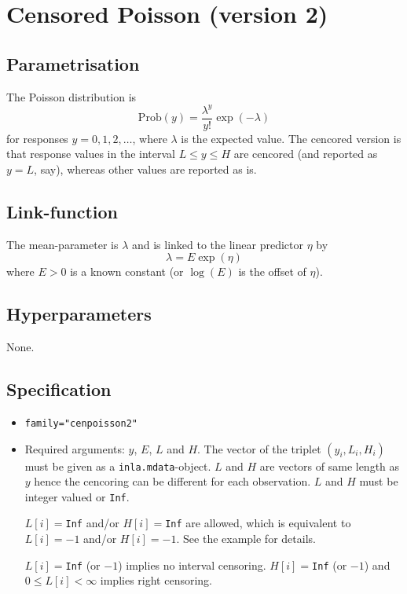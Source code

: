 \documentclass[a4paper,11pt]{article}
\begin{document}
\section*{Censored Poisson (version 2)}

\subsection*{Parametrisation}

The Poisson distribution is
\begin{displaymath}
    \text{Prob}(y) = \frac{\lambda^{y}}{y!}\exp(-\lambda)
\end{displaymath}
for responses $y=0, 1, 2, \ldots$, where $\lambda$ is the expected
value.  The cencored version is that response values in the interval
$L \le y \le H$ are cencored (and reported as $y=L$, say), whereas
other values are reported as is.

\subsection*{Link-function}

The mean-parameter is $\lambda$ and is linked to the linear predictor $\eta$
by
\begin{displaymath}
    \lambda = E \exp(\eta)
\end{displaymath}
where $E>0$ is a known constant (or $\log(E)$ is the offset of $\eta$).

\subsection*{Hyperparameters}

None.

\subsection*{Specification}

\begin{itemize}
\item \texttt{family="cenpoisson2"}
\item Required arguments: $y$, $E$, $L$ and $H$. The vector of the
    triplet $(y_i,L_i,H_i)$ must be given as a
    \texttt{inla.mdata}-object. $L$ and $H$ are vectors of same length
    as $y$ hence the cencoring can be different for each observation.
    $L$ and $H$ must be integer valued or \texttt{Inf}.

    $L[i]=$\texttt{Inf} and/or $H[i]=$\texttt{Inf} are allowed, which
    is equivalent to $L[i]= -1$ and/or $H[i] = -1$. See the example
    for details.

    $L[i]=$\texttt{Inf} (or $-1$) implies no interval censoring.
    $H[i]=$\texttt{Inf} (or $-1$) and $0\leq L[i]<\infty$ implies
    right censoring.
\end{itemize}
\end{document}
